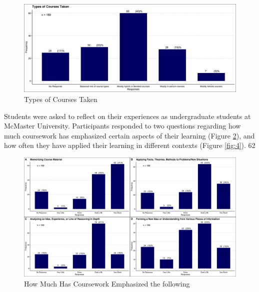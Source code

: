 \documentclass{article}
\providecommand{\figref}[1]{(Figure \ref{#1})}  %
\begin{document}
\begin{figure}[H]
	\includegraphics[width=\textwidth]{figures_4f06/types_of_courses_taken.jpg}
	\caption{Types of Courses Taken}
	\label{fig:2}
\end{figure}

Students were asked to reflect on their experiences as undergraduate students at McMaster University. Participants responded to two questions regarding how much coursework has emphasized certain aspects of their learning \figref{fig:3}, and how often they have applied their learning in different contexts \figref{fig:4}. 62

\begin{figure}[H]
	\includegraphics[width=\textwidth]{figures_4f06/howmuch_coursework_emphasized_thefollowing.jpg}
	\caption{How Much Has Coursework Emphasized the following}
	\label{fig:3}
\end{figure}
\end{document}
